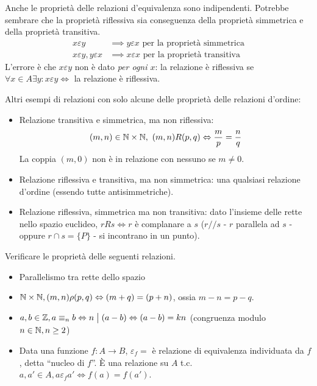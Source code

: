 Anche le propriet\`a delle relazioni d'equivalenza sono indipendenti. Potrebbe sembrare che la propriet\`a riflessiva sia conseguenza della propriet\`a simmetrica e della propriet\`a transitiva.
\begin{align*}
x \varepsilon y &\implies y \varepsilon x \text{ per la propriet\`a simmetrica} \\
x \varepsilon y , y \varepsilon x &\implies x \varepsilon x \text{ per la propriet\`a transitiva}
\end{align*}
L'errore \`e che $x \varepsilon y$ non \`e dato \textit{per ogni $x$}: la relazione \`e riflessiva se $\forall x \in A \exists y : x \varepsilon y \iff $ la relazione \`e riflessiva.

Altri esempi di relazioni con solo alcune delle propriet\`a delle relazioni d'ordine:
\begin{itemize}
  \item Relazione transitiva e simmetrica, ma non riflessiva:
  \[
  (m, n) \in \mathbb{N} \times \mathbb{N}, \ (m,n) R (p, q) \Leftrightarrow \frac{m}{p} = \frac{n}{q}
  \]
  La coppia $(m,0)$ non \`e in relazione con nessuno se $m \neq 0$.
  \item Relazione riflessiva e transitiva, ma non simmetrica: una qualsiasi relazione d'ordine (essendo tutte antisimmetriche).
  \item Relazione riflessiva, simmetrica ma non transitiva: dato l'insieme delle rette nello spazio euclideo, $r R s \iff r $ \`e complanare a $s$ ($r // s$ - $r$ parallela ad $s$ - oppure $r \cap s = \{ P \}$ - si incontrano in un punto).
\end{itemize}

\begin{esercizio}
Verificare le propriet\`a delle seguenti relazioni.
\begin{itemize}
  \item Parallelismo tra rette dello spazio 
  \item $\mathbb{N} \times \mathbb{N}, (m, n) \rho (p, q) \Leftrightarrow (m + q) = (p + n)$, ossia $m - n = p - q$. 
  \item $a, b \in \mathbb{Z}, a \equiv_n b \Leftrightarrow n \bigm| (a - b) \Leftrightarrow (a-b) = k n$ (congruenza modulo $n \in \mathbb{N}, n \ge 2$) 
  \item Data una funzione $f: A \to B $, $ \varepsilon_f = $ \`e relazione di equivalenza individuata da $f$, detta ``nucleo di $f$''. \`E una relazione su $A$ t.c. $a, a' \in A, a \varepsilon_f a' \iff f(a) = f(a')$. 
\end{itemize}
\end{esercizio}

